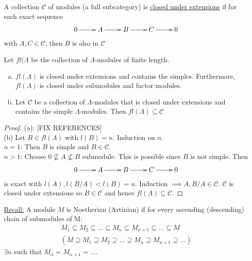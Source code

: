 \begin{defin}
    A collection \(\mathcal{C}\) of modules (a full subcategory) is \underline{closed under extensions} if for each exact sequence 
    \begin{align*}
        \xymatrix{0\ar[r] & A\ar[r] & B\ar[r] & C\ar[r] & 0}
    \end{align*}
    with \(A, C\in\mathcal{C}\), then \(B\) is also in \(\mathcal{C}\)
\end{defin}
Let \(fl(\Lambda\) be the collection of \(\Lambda\)-modules of finite length.
\begin{prop}
\label{Proposition 13}
\begin{enumerate}[(a)]
    \item \(fl(\Lambda)\) is closed under extensions and contains the simples. Furthermore, \(fl(\Lambda)\) is closed under submodules and factor modules.
    \item Let \(\mathcal{C}\) be a collection of \(\Lambda\)-modules that is closed under extensions and contains the simple \(\Lambda\)-modules. Then \(fl(\Lambda)\subseteq\mathcal{C}\)
\end{enumerate}
\end{prop}
\begin{proof}(a): [FIX REFERENCES]\\
(b) Let \(B\in fl(\Lambda)\) with \(l(B) = n\). Induction on \(n\).\\
\noindent \(n = 1\): Then \(B\) is simple and \(B\in\mathcal{C}\).\\
\noindent\(n>1\): Choose \(0\not\subseteq A\not\subseteq B\) submodule. This is possible since \(B\) is not simple. Then
\begin{align*}
    \xymatrix{0\ar[r] & A\ar[r] & B\ar[r] & C\ar[r] & 0}
\end{align*}
is exact with \(l(A),l(B/A)<l(B) = n\). Induction \(\implies A, B/A\in\mathcal{C}\). \(\mathcal{C}\) is closed under extensions so \(B\in\mathcal{C}\) and hence \(fl(\Lambda) \subseteq \mathcal{C}\).
\end{proof}
\noindent\underline{Recall:} A module \(M\) is Noetherian (Artinian) if for every ascending (descending) chain of submodules of M:
\begin{gather*}
    M_1\subseteq M_2\subseteq\dots\subseteq M_n \subseteq M_{n+1} \subseteq\dots\subseteq M \\
    (M \supseteq M_1\supseteq M_2\supseteq\dots\supseteq M_n \supseteq M_{n+1} \supseteq\dots)
\end{gather*}
\(\exists n\) such that \(M_n = M_{n+1} = \dots\).

